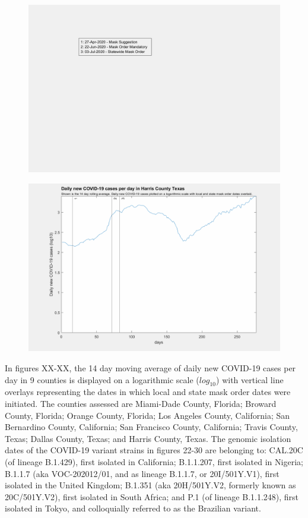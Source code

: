 \documentclass[]{article}
\begin{document}
\begin{figure}[!h]
	\includegraphics[width=\linewidth]{legends/harris_mask_order_legend.png}
	\caption{}
	\label{fig:legends/harris_mask_order_legendLabel}
\end{figure}

\begin{figure}[!h]
	\includegraphics[width=\linewidth]{images/harris_mask_order_log.png}
	\caption{}
	\label{fig:images/harris_mask_order_logLabel}
\end{figure}

\FloatBarrier

In figures XX-XX, the 14 day moving average of daily new COVID-19 cases per day in 9 counties is displayed on a logarithmic scale ($log_{10}$) with vertical line overlays representing the dates in which local and state mask order dates were initiated. The counties assessed are Miami-Dade County, Florida; Broward County, Florida; Orange County, Florida; Los Angeles County, California; San Bernardino County, California; San Francisco County, California; Travis County, Texas; Dallas County, Texas; and Harris County, Texas. The genomic isolation dates of the COVID-19 variant strains in figures 22-30 are belonging to: CAL.20C (of lineage B.1.429), first isolated in California; B.1.1.207, first isolated in Nigeria; B.1.1.7 (aka VOC-202012/01, and as lineage B.1.1.7, or 20I/501Y.V1), first isolated in the United Kingdom; B.1.351 (aka 20H/501Y.V2, formerly known as 20C/501Y.V2), first isolated in South Africa; and P.1 (of lineage B.1.1.248), first isolated in Tokyo, and colloquially referred to as the Brazilian variant.
\end{document}
